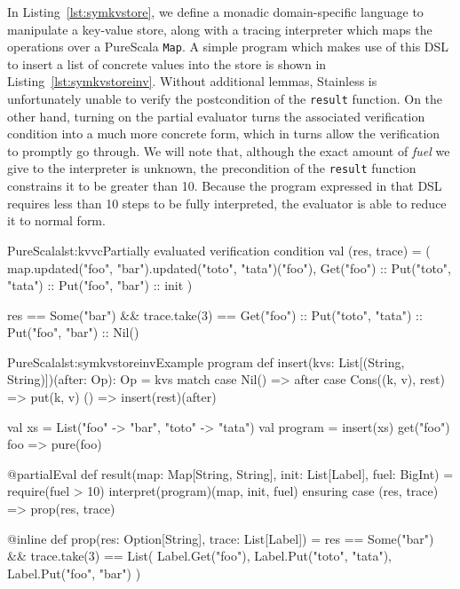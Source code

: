 \documentclass[a4paper,twoside]{article}
\newcommand{\RefCode}[1]{Listing~\ref{#1}}
\newcommand{\stt}[1]{\texttt{\small{#1}}}
\begin{document}
In \RefCode{lst:symkvstore}, we define a monadic domain-specific language to manipulate a key-value store, along with a tracing interpreter which maps the operations over a PureScala \stt{Map}. A simple program which makes use of this DSL to insert a list of concrete values into the store is shown in \RefCode{lst:symkvstoreinv}. Without additional lemmas, Stainless is unfortunately unable to verify the postcondition of the \stt{result} function. On the other hand, turning on the partial evaluator turns the associated verification condition into a much more concrete form, which in turns allow the verification to promptly go through. We will note that, although the exact amount of \textit{fuel} we give to the interpreter is unknown, the precondition of the \stt{result} function constrains it to be greater than 10. Because the program expressed in that DSL requires less than 10 steps to be fully interpreted, the evaluator is able to reduce it to normal form.

\begin{Code}{PureScala}{lst:kvvc}{Partially evaluated verification condition}
val (res, trace) = (
  map.updated("foo", "bar").updated("toto", "tata")("foo"),
  Get("foo") :: Put("toto", "tata") :: Put("foo", "bar") :: init
)

res == Some("bar") &&
trace.take(3) == Get("foo") :: Put("toto", "tata") :: Put("foo", "bar") :: Nil()
\end{Code}

\begin{Code}{PureScala}{lst:symkvstoreinv}{Example program}
def insert(kvs: List[(String, String)])(after: Op): Op = kvs match {
  case Nil() => after
  case Cons((k, v), rest) => put(k, v) { () => insert(rest)(after) }
}

val xs = List("foo" -> "bar", "toto" -> "tata")
val program = insert(xs) {
  get("foo") { foo =>
    pure(foo)
  }
}

@partialEval
def result(map: Map[String, String], init: List[Label], fuel: BigInt) = {
  require(fuel > 10)
  interpret(program)(map, init, fuel)
} ensuring { case (res, trace) => prop(res, trace) }

@inline
def prop(res: Option[String], trace: List[Label]) = {
  res == Some("bar") &&
  trace.take(3) == List(
    Label.Get("foo"),
    Label.Put("toto", "tata"),
    Label.Put("foo", "bar")
  )
}
\end{Code}
\end{document}
